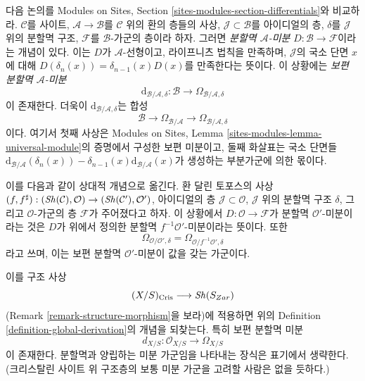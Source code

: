 \medskip\noindent
다음 논의를 Modules on Sites, Section
\ref{sites-modules-section-differentials}와 비교하라.
$\mathcal{C}$를 사이트, $\mathcal{A} \to \mathcal{B}$를
$\mathcal{C}$ 위의 환의 층들의 사상,
$\mathcal{J} \subset \mathcal{B}$를 아이디얼의 층,
$\delta$를 $\mathcal{J}$ 위의 분할멱 구조, $\mathcal{F}$를
$\mathcal{B}$-가군의 층이라 하자. 그러면
{\it 분할멱 $\mathcal{A}$-미분}
$D : \mathcal{B} \to \mathcal{F}$이라는 개념이 있다.
이는 $D$가 $\mathcal{A}$-선형이고, 라이프니츠 법칙을 만족하며,
$\mathcal{J}$의 국소 단면 $x$에 대해
$D(\delta_n(x)) = \delta_{n - 1}(x)D(x)$를 만족한다는 뜻이다.
이 상황에는 {\it 보편 분할멱 $\mathcal{A}$-미분}
$$
\text{d}_{\mathcal{B}/\mathcal{A}, \delta} :
\mathcal{B}
\longrightarrow
\Omega_{\mathcal{B}/\mathcal{A}, \delta}
$$
이 존재한다. 더욱이 $\text{d}_{\mathcal{B}/\mathcal{A}, \delta}$는
합성
$$
\mathcal{B}
\longrightarrow
\Omega_{\mathcal{B}/\mathcal{A}}
\longrightarrow
\Omega_{\mathcal{B}/\mathcal{A}, \delta}
$$
이다. 여기서 첫째 사상은 Modules on Sites, Lemma
\ref{sites-modules-lemma-universal-module}의 증명에서 구성한 보편
미분이고, 둘째 화살표는 국소 단면들
$\text{d}_{\mathcal{B}/\mathcal{A}}(\delta_n(x)) -
\delta_{n - 1}(x)\text{d}_{\mathcal{B}/\mathcal{A}}(x)$가 생성하는
부분가군에 의한 몫이다.

\medskip\noindent
이를 다음과 같이 상대적 개념으로 옮긴다. 환 달린 토포스의 사상
$(f, f^\sharp) : (\mathop{\mathit{Sh}}\nolimits(\mathcal{C}), \mathcal{O}) \to
(\mathop{\mathit{Sh}}\nolimits(\mathcal{C}'), \mathcal{O}')$,
아이디얼의 층 $\mathcal{J} \subset \mathcal{O}$,
$\mathcal{J}$ 위의 분할멱 구조 $\delta$, 그리고
$\mathcal{O}$-가군의 층 $\mathcal{F}$가 주어졌다고 하자.
이 상황에서 $D : \mathcal{O} \to \mathcal{F}$가 분할멱
$\mathcal{O}'$-미분이라는 것은 $D$가 위에서 정의한 분할멱
$f^{-1}\mathcal{O}'$-미분이라는 뜻이다. 또한
$$
\Omega_{\mathcal{O}/\mathcal{O}', \delta} =
\Omega_{\mathcal{O}/f^{-1}\mathcal{O}', \delta}
$$
라고 쓰며, 이는 보편 분할멱 $\mathcal{O}'$-미분이 값을 갖는
가군이다.

\medskip\noindent
이를 구조 사상
$$
(X/S)_{\text{Cris}} \longrightarrow \mathop{\mathit{Sh}}\nolimits(S_{Zar})
$$
(Remark \ref{remark-structure-morphism}을 보라)에 적용하면 위의
Definition \ref{definition-global-derivation}의 개념을 되찾는다.
특히 보편 분할멱 미분
$$
d_{X/S} : \mathcal{O}_{X/S} \to \Omega_{X/S}
$$
이 존재한다. 분할멱과 양립하는 미분 가군임을 나타내는 장식은
표기에서 생략한다. (크리스탈린 사이트 위 구조층의 보통 미분
가군을 고려할 사람은 없을 듯하다.)

